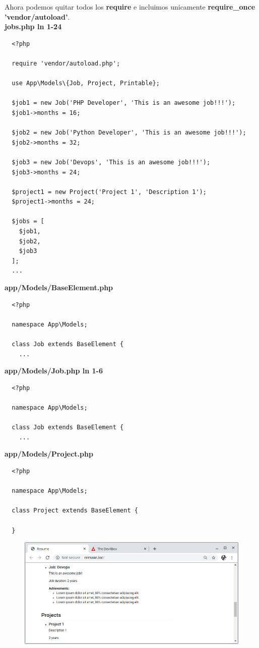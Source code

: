 \documentclass{article}
\begin{document}
Ahora podemos quitar todos los \textbf{require} e incluimos unicamente
\textbf{require\_once 'vendor/autoload'}.\\

\textbf{jobs.php ln 1-24}
\begin{verbatim}
  <?php

  require 'vendor/autoload.php';

  use App\Models\{Job, Project, Printable};

  $job1 = new Job('PHP Developer', 'This is an awesome job!!!');
  $job1->months = 16;

  $job2 = new Job('Python Developer', 'This is an awesome job!!!');
  $job2->months = 32;

  $job3 = new Job('Devops', 'This is an awesome job!!!');
  $job3->months = 24;

  $project1 = new Project('Project 1', 'Description 1');
  $project1->months = 24;

  $jobs = [
    $job1,
    $job2,
    $job3
  ];
  ...
\end{verbatim}

\textbf{app/Models/BaseElement.php}
\begin{verbatim}
  <?php

  namespace App\Models;

  class Job extends BaseElement {
    ...
\end{verbatim}

\newpage

\textbf{app/Models/Job.php ln 1-6}
\begin{verbatim}
  <?php

  namespace App\Models;

  class Job extends BaseElement {
    ...
\end{verbatim}

\textbf{app/Models/Project.php}
\begin{verbatim}
  <?php

  namespace App\Models;

  class Project extends BaseElement {

  }
\end{verbatim}

\begin{figure}[h!]
  \centering
  \includegraphics[scale=0.5]{./Pictures/063_autoload.png}
\end{figure}
\end{document}
